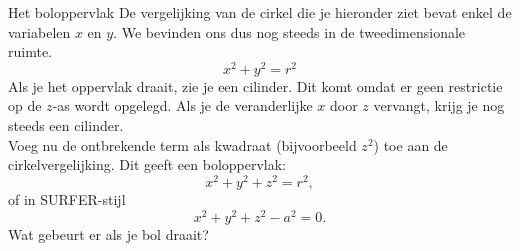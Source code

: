 \begin{surferPage}[Boloppervlak]{Het boloppervlak}
De vergelijking van de cirkel die je hieronder ziet bevat enkel de variabelen $x$ en $y$. We bevinden ons dus nog steeds in de tweedimensionale ruimte.
\[x^2+y^2=r^2\]
Als je het oppervlak draait, zie je een cilinder. Dit komt omdat er geen restrictie op de $z$-as wordt opgelegd. Als je de veranderlijke $x$ door $z$ vervangt, krijg je nog steeds een cilinder.\\
Voeg nu de ontbrekende term als kwadraat (bijvoorbeeld $z^2$) toe aan de cirkelvergelijking. 
Dit geeft een boloppervlak:
\[x^2+y^2+z^2=r^2,\]
of in SURFER-stijl
\[x^2+y^2+z^2-a^2 = 0.\]
Wat gebeurt er als je bol draait?
\end{surferPage}
